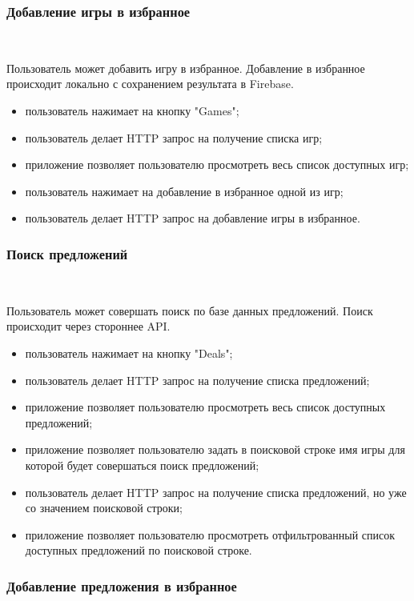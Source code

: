 \subsubsection{Добавление игры в избранное}~\par

Пользователь может добавить игру в избранное. Добавление в избранное происходит локально с сохранением результата в Firebase.

\begin{itemize}
  \item пользователь нажимает на кнопку "Games";
  \item пользователь делает HTTP запрос на получение списка игр;
  \item приложение позволяет пользователю просмотреть весь список доступных игр;
  \item пользователь нажимает на добавление в избранное одной из игр;
  \item пользователь делает HTTP запрос на добавление игры в избранное.
\end{itemize}

\subsubsection{Поиск предложений}~\par
Пользователь может совершать поиск по базе данных предложений. Поиск происходит через стороннее API.

\begin{itemize}
  \item пользователь нажимает на кнопку "Deals";
  \item пользователь делает HTTP запрос на получение списка предложений;
  \item приложение позволяет пользователю просмотреть весь список доступных предложений;
  \item приложение позволяет пользователю задать в поисковой строке имя игры для которой будет совершаться поиск предложений;
  \item пользователь делает HTTP запрос на получение списка предложений, но уже со значением поисковой строки;
  \item приложение позволяет пользователю просмотреть отфильтрованный список доступных предложений по поисковой строке.
\end{itemize}


\subsubsection{Добавление предложения в избранное}~\par

